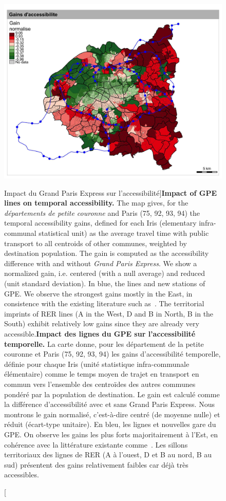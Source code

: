 \begin{figure}%
	\includegraphics[width=\linewidth]{Figures/Final/1-2-1-fig-casestudies-gpe.jpg}
	\caption[Impact of \emph{Grand Paris Express} on accessibility][Impact du Grand Paris Express sur l'accessibilité]{\textbf{Impact of GPE lines on temporal accessibility.} The map gives, for the \emph{départements de petite couronne} and Paris (75, 92, 93, 94) the temporal accessibility gains, defined for each Iris (elementary infra-communal statistical unit) as the average travel time with public transport to all centroids of other communes, weighted by destination population. The gain is computed as the accessibility difference with and without \emph{Grand Paris Express}. We show a normalized gain, i.e. centered (with a null average) and reduced (unit standard deviation). In blue, the lines and new stations of GPE. We observe the strongest gains mostly in the East, in consistence with the existing literature such as~\cite{beaucire2013grand}. The territorial imprints of RER lines (A in the West, D and B in North, B in the South) exhibit relatively low gains since they are already very accessible.\label{fig:casestudies:gpe}}{\textbf{Impact des lignes du GPE sur l'accessibilité temporelle.} La carte donne, pour les département de la petite couronne et Paris (75, 92, 93, 94) les gains d'accessibilité temporelle, définie pour chaque Iris (unité statistique infra-communale élémentaire) comme le temps moyen de trajet en transport en commun vers l'ensemble des centroïdes des autres communes pondéré par la population de destination. Le gain est calculé comme la différence d'accessibilité avec et sans Grand Paris Express. Nous montrons le gain normalisé, c'est-à-dire centré (de moyenne nulle) et réduit (écart-type unitaire). En bleu, les lignes et nouvelles gare du GPE. On observe les gains les plus forts majoritairement à l'Est, en cohérence avec la littérature existante comme~\cite{beaucire2013grand}. Les sillons territoriaux des lignes de RER (A à l'ouest, D et B au nord, B au sud) présentent des gains relativement faibles car déjà très accessibles.\label{fig:casestudies:gpe}}
\end{figure}
